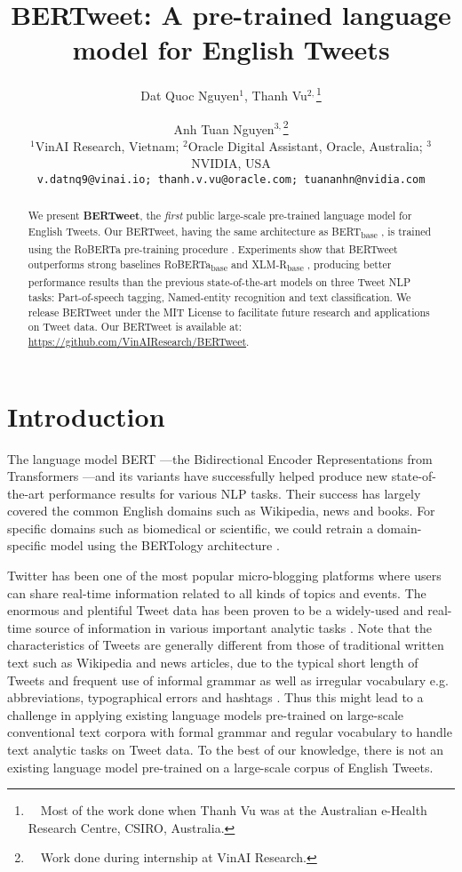 \documentclass[11pt,a4paper]{article}
\title{BERTweet: A pre-trained language model for English Tweets}
\author{Dat Quoc Nguyen$^1$, Thanh Vu$^{2,}$\thanks{\ \ Most of the work done
when Thanh Vu was at the Australian e-Health Research Centre, CSIRO, Australia. }   \and Anh Tuan Nguyen$^{3,}$\thanks{\ \ Work done during internship at  VinAI Research.} \\
  $^1$VinAI Research, Vietnam; $^2$Oracle Digital Assistant, Oracle, Australia; $^3$NVIDIA, USA\\
   \tt{\normalsize v.datnq9@vinai.io; thanh.v.vu@oracle.com; tuananhn@nvidia.com}}
\date{}
\begin{document}
\maketitle
\begin{abstract}
We present \textbf{BERTweet}, the \emph{first} public large-scale pre-trained language model  for English Tweets. Our BERTweet, having the same architecture as BERT\textsubscript{base} \citep{devlin-etal-2019-bert}, is trained using the RoBERTa pre-training procedure \citep{RoBERTa}. 
Experiments show that BERTweet outperforms strong baselines RoBERTa\textsubscript{base} and XLM-R\textsubscript{base} \citep{conneau2019unsupervised}, producing better performance results than the previous state-of-the-art models on three Tweet NLP tasks: Part-of-speech tagging, Named-entity recognition and text classification. We release BERTweet under the MIT License to facilitate future research and  applications on Tweet data. Our BERTweet is available at: \url{https://github.com/VinAIResearch/BERTweet}.
\end{abstract}






\section{Introduction}\label{sec:intro}


The language model BERT \citep{devlin-etal-2019-bert}---the Bidirectional Encoder Representations from Transformers \citep{NIPS2017_7181}---and its variants 
have successfully helped produce new state-of-the-art performance results for various NLP tasks. Their success has largely covered the common English domains such as Wikipedia, news and books. For specific domains such as biomedical or scientific, we could retrain a domain-specific model using the BERTology architecture \cite{beltagy-etal-2019-scibert,btz682,dontstoppretraining2020}.

Twitter has been one of the most popular micro-blogging platforms where users can share real-time information related to all kinds of topics and events. The enormous and plentiful Tweet data has been proven to be a widely-used and real-time source of information in various important analytic tasks \cite{GhaniHHA19}. 
Note that the characteristics of Tweets are generally different from those of traditional written text such as Wikipedia and news articles, due to the typical short length of Tweets and frequent use of informal grammar as well as irregular vocabulary e.g. abbreviations, typographical errors and hashtags \citep{eisenstein-2013-bad,2414425.2414430}. Thus this might lead to a challenge in applying existing language models pre-trained on large-scale conventional text corpora with formal grammar and regular vocabulary to handle text analytic tasks on Tweet data. To the best of our knowledge, there is not an existing language model pre-trained on a large-scale corpus of English Tweets. 
\end{document}
